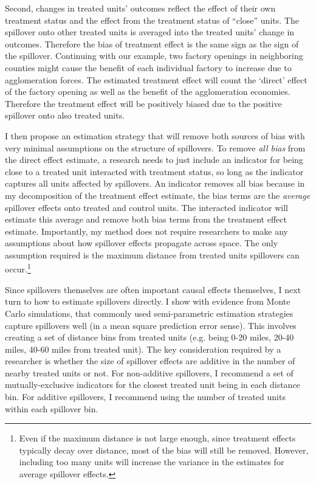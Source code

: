 \documentclass[11pt]{article}
\begin{document}
Second, changes in treated units' outcomes reflect the effect of their own treatment status and the effect from the treatment status of ``close'' units. The spillover onto other treated units is averaged into the treated units' change in outcomes. Therefore the bias of treatment effect is the same sign as the sign of the spillover. Continuing with our example, two factory openings in neighboring counties might cause the benefit of each individual factory to increase due to agglomeration forces. The estimated treatment effect will count the `direct' effect of the factory opening as well as the benefit of the agglomeration economies. Therefore the treatment effect will be positively biased due to the positive spillover onto also treated units. 

I then propose an estimation strategy that will remove both sources of bias with very minimal assumptions on the structure of spillovers. To remove \textit{all bias} from the direct effect estimate, a research needs to just include an indicator for being close to a treated unit interacted with treatment status, so long as the indicator captures all units affected by spillovers. An indicator removes all bias because in my decomposition of the treatment effect estimate, the bias terms are the \textit{average} spillover effects onto treated and control units. The interacted indicator will estimate this average and remove both bias terms from the treatment effect estimate. Importantly, my method does not require researchers to make any assumptions about how spillover effects propagate across space. The only assumption required is the maximum distance from treated units spillovers can occur.\footnote{Even if the maximum distance is not large enough, since treatment effects typically decay over distance, most of the bias will still be removed. However, including too many units will increase the variance in the estimates for average spillover effects.} 

Since spillovers themselves are often important causal effects themselves, I next turn to how to estimate spillovers directly. I show with evidence from Monte Carlo simulations, that commonly used semi-parametric estimation strategies capture spillovers well (in a mean square prediction error sense). This involves creating a set of distance bins from treated units (e.g. being 0-20 miles, 20-40 miles, 40-60 miles from treated unit). The key consideration required by a researcher is whether the size of spillover effects are additive in the number of nearby treated units or not. For non-additive spillovers, I recommend a set of mutually-exclusive indicators for the closest treated unit being in each distance bin. For additive spillovers, I recommend using the number of treated units within each spillover bin. 
\end{document}
